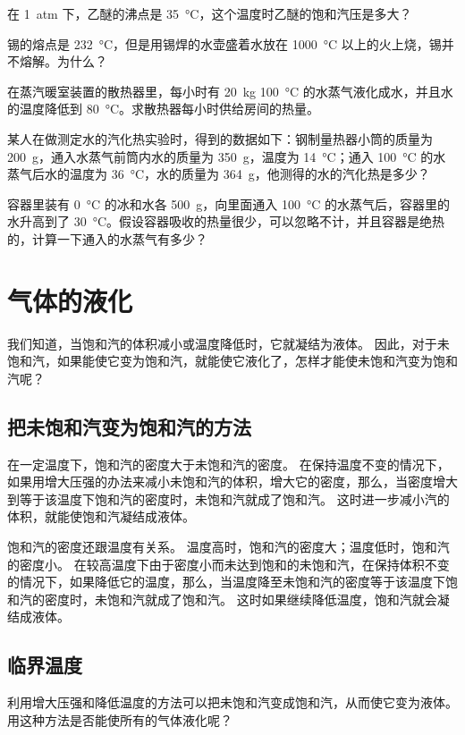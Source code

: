 \begin{Practice}
\begin{question}
  \item 在 \qty{1}{atm} 下，乙醚的沸点是 \qty{35}{\celsius}，这个温度时乙醚的饱和汽压是多大？
  \item 锡的熔点是 \qty{232}{\celsius}，但是用锡焊的水壶盛着水放在 \qty{1000}{\celsius} 以上的火上烧，锡并不熔解。为什么？
  \item 在蒸汽暖室装置的散热器里，每小时有 \qty{20}{kg} \qty{100}{\celsius} 的水蒸气液化成水，并且水的温度降低到 \qty{80}{\celsius}。求散热器每小时供给房间的热量。
  \item 某人在做测定水的汽化热实验时，得到的数据如下：钢制量热器小筒的质量为 \qty{200}{g}，通入水蒸气前筒内水的质量为 \qty{350}{g}，温度为 \qty{14}{\celsius}；通入 \qty{100}{\celsius} 的水蒸气后水的温度为 \qty{36}{\celsius}，水的质量为 \qty{364}{g}，他测得的水的汽化热是多少？
  \item 容器里装有 \qty{0}{\celsius} 的冰和水各 \qty{500}{g}，向里面通入 \qty{100}{\celsius} 的水蒸气后，容器里的水升高到了 \qty{30}{\celsius}。假设容器吸收的热量很少，可以忽略不计，并且容器是绝热的，计算一下通入的水蒸气有多少？
\end{question}
\end{Practice}

\section{气体的液化}
我们知道，当饱和汽的体积减小或温度降低时，它就凝结为液体。
因此，对于未饱和汽，如果能使它变为饱和汽，就能使它液化了，怎样才能使未饱和汽变为饱和汽呢？

\subsection{把未饱和汽变为饱和汽的方法}

在一定温度下，饱和汽的密度大于未饱和汽的密度。
在保持温度不变的情况下，如果用增大压强的办法来减小未饱和汽的体积，增大它的密度，那么，当密度增大到等于该温度下饱和汽的密度时，未饱和汽就成了饱和汽。
这时进一步减小汽的体积，就能使饱和汽凝结成液体。

饱和汽的密度还跟温度有关系。
温度高时，饱和汽的密度大；温度低时，饱和汽的密度小。
在较高温度下由于密度小而未达到饱和的未饱和汽，在保持体积不变的情况下，如果降低它的温度，那么，当温度降至未饱和汽的密度等于该温度下饱和汽的密度时，未饱和汽就成了饱和汽。
这时如果继续降低温度，饱和汽就会凝结成液体。

\subsection{临界温度}
利用增大压强和降低温度的方法可以把未饱和汽变成饱和汽，从而使它变为液体。用这种方法是否能使所有的气体液化呢？

